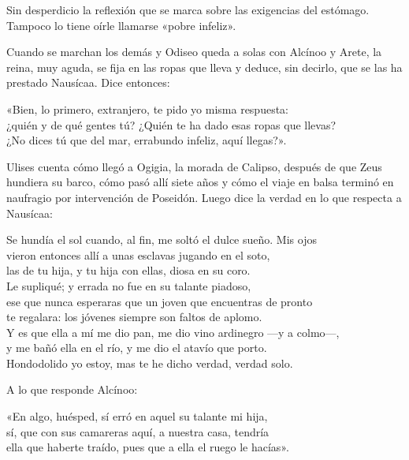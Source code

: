 Sin desperdicio la reflexión que se marca sobre las exigencias del estómago. Tampoco lo tiene oírle llamarse «pobre infeliz».

Cuando se marchan los demás y Odiseo queda a solas con Alcínoo y Arete, la reina, muy aguda, se fija en las ropas que lleva y deduce, sin decirlo, que se las ha prestado Nausícaa. Dice entonces:

\begin{versocita}
«Bien, lo primero, extranjero, te pido yo misma respuesta:\\
¿quién y de qué gentes tú? ¿Quién te ha dado esas ropas que llevas?\\
¿No dices tú que del mar, errabundo infeliz, aquí llegas?».
\end{versocita}

Ulises cuenta cómo llegó a Ogigia, la morada de Calipso, después de que Zeus hundiera su barco, cómo pasó allí siete años y cómo el viaje en balsa terminó en naufragio por intervención de Poseidón. Luego dice la verdad en lo que respecta a Nausícaa:

\begin{versocita}
Se hundía el sol cuando, al fin, me soltó el dulce sueño. Mis ojos\\
vieron entonces allí a unas esclavas jugando en el soto,\\
las de tu hija, y tu hija con ellas, diosa en su coro.\\
Le supliqué; y errada no fue en su talante piadoso,\\
ese que nunca esperaras que un joven que encuentras de pronto\\
te regalara: los jóvenes siempre son faltos de aplomo.\\
Y es que ella a mí me dio pan, me dio vino ardinegro ---y a colmo---,\\
y me bañó ella en el río, y me dio el atavío que porto.\\
Hondodolido yo estoy, mas te he dicho verdad, verdad solo.
\end{versocita}

A lo que responde Alcínoo:

\begin{versocita}
«En algo, huésped, sí erró en aquel su talante mi hija,\\
sí, que con sus camareras aquí, a nuestra casa, tendría\\
ella que haberte traído, pues que a ella el ruego le hacías».
\end{versocita}

